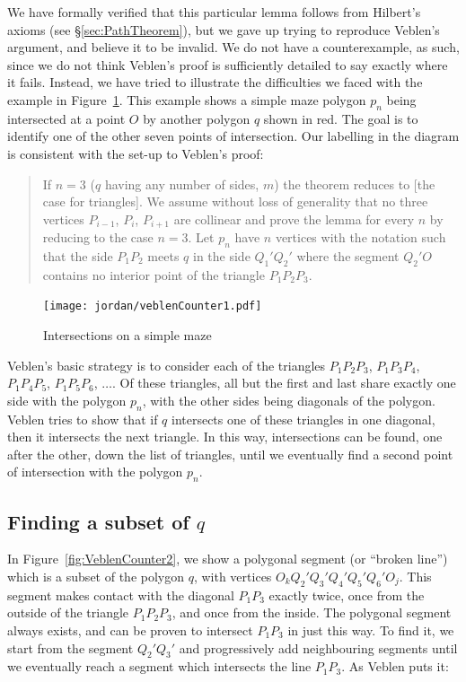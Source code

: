 We have formally verified that this particular lemma follows from Hilbert's axioms (see \S\ref{sec:PathTheorem}), but we gave up trying to reproduce Veblen's argument, and believe it to be invalid. We do not have a counterexample, as such, since we do not think Veblen's proof is sufficiently detailed to say exactly where it fails. Instead, we have tried to illustrate the difficulties we faced with the example in Figure~\ref{fig:VeblenCounter1}. This example shows a simple maze polygon $p_n$ being intersected at a point $O$ by another polygon $q$ shown in red. The goal is to identify one of the other seven points of intersection. Our labelling in the diagram is consistent with the set-up to Veblen's proof:

\begin{quote}
If $n=3$ ($q$ having any number of sides, $m$) the theorem reduces to [the case for triangles]. We assume without loss of generality that no three vertices $P_{i-1}$, $P_i$, $P_{i+1}$ are collinear and prove the lemma for every $n$ by reducing to the case $n=3$. Let $p_n$ have $n$ vertices with the notation such that the side $P_1P_2$ meets $q$ in the side $Q_1'Q_2'$ where the segment $Q_2'O$ contains no interior point of the triangle $P_1P_2P_3$.\end{quote}

\begin{figure}
\centering
\texttt{[image: jordan/veblenCounter1.pdf]}
\caption{Intersections on a simple maze}
\label{fig:VeblenCounter1}
\end{figure}

Veblen's basic strategy is to consider each of the triangles $P_1P_2P_3$, $P_1P_3P_4$, $P_1P_4P_5$, $P_1P_5P_6$, $\ldots$. Of these triangles, all but the first and last share exactly one side with the polygon $p_n$, with the other sides being diagonals of the polygon. Veblen tries to show that if $q$ intersects one of these triangles in one diagonal, then it intersects the next triangle. In this way, intersections can be found, one after the other, down the list of triangles, until we eventually find a second point of intersection with the polygon $p_n$.

\subsection{Finding a subset of $q$}\label{sec:SubsetOfQ}
In Figure~\ref{fig:VeblenCounter2}, we show a polygonal segment  (or ``broken line'') which is a subset of the polygon $q$, with vertices $O_kQ_2'Q_3'Q_4'Q_5'Q_6'O_j$. This segment makes contact with the diagonal $P_1P_3$ exactly twice, once from the outside of the triangle $P_1P_2P_3$, and once from the inside. The polygonal segment always exists, and can be proven to intersect $P_1P_3$ in just this way. To find it, we start from the segment $Q_2'Q_3'$ and progressively add neighbouring segments until we eventually reach a segment which intersects the line $P_1P_3$. As Veblen puts it:

